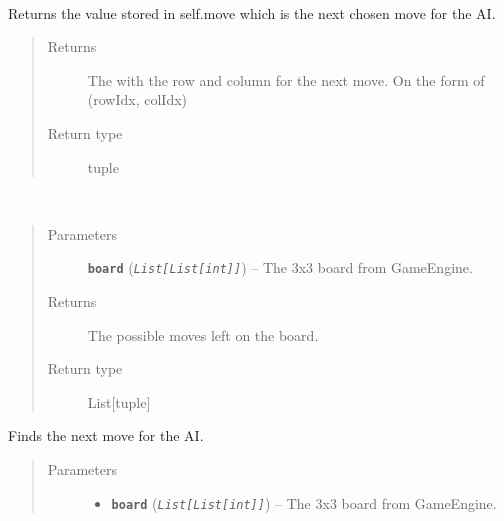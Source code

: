 \documentclass[letterpaper,10pt,english]{sphinxmanual}
\begin{document}
\begin{fulllineitems}
\label{index:AI._AIEasy}~

\begin{fulllineitems}
\label{index:AI._AIEasy.getMove}
Returns the value stored in self.move which is the next chosen move for the AI.
\begin{quote}\begin{description}
\item[{Returns}] \leavevmode
The with the row and column for the next move. On the form of (rowIdx, colIdx)

\item[{Return type}] \leavevmode
tuple

\end{description}\end{quote}

\end{fulllineitems}


\begin{fulllineitems}
\label{index:AI._AIEasy.getPossibleMoves}~\begin{quote}\begin{description}
\item[{Parameters}] \leavevmode
\textbf{\texttt{board}} (\emph{\texttt{List{[}List{[}int{]}{]}}}) -- The 3x3 board from GameEngine.

\item[{Returns}] \leavevmode
The possible moves left on the board.

\item[{Return type}] \leavevmode
List{[}tuple{]}

\end{description}\end{quote}

\end{fulllineitems}


\begin{fulllineitems}
\label{index:AI._AIEasy.nextMove}
Finds the next move for the AI.
\begin{quote}\begin{description}
\item[{Parameters}] \leavevmode\begin{itemize}
\item {} 
\textbf{\texttt{board}} (\emph{\texttt{List{[}List{[}int{]}{]}}}) -- The 3x3 board from GameEngine.


\end{itemize}
\end{description}
\end{quote}
\end{fulllineitems}
\end{fulllineitems}
\end{document}
